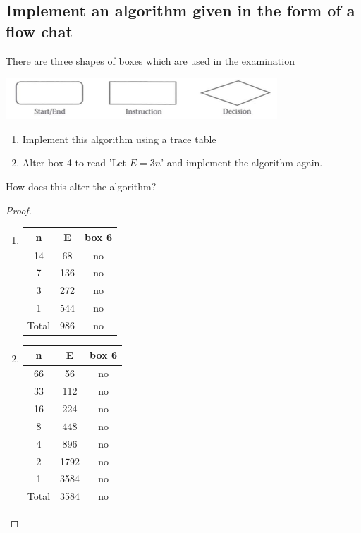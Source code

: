 \documentclass[a4paper]{article}
\begin{document}
\subsection{Implement an algorithm given in the form of a flow chat}
There are three shapes of boxes which are used in the examination\\
\begin{centering}
\includegraphics{img_D/2.png}
\end{centering}
\begin{eg}
\vspace{10pt}

\begin{enumerate}
\item Implement this algorithm using a trace table
\item Alter box 4 to read 'Let $E=3n$' and implement the algorithm again.
\end{enumerate}
How does this alter the algorithm?

\begin{proof}

\begin{enumerate}
\item \begin{tabular}{|c|c|c|}
          \hline
          n&E& box 6\\
          \hline
          14&68&no\\
          \hline
          7&136& no\\
          \hline
          3&272 &no\\
          \hline
          1&544 &no\\
          \hline
          Total & 986&no\\
          \hline          
          \end{tabular}
          
\item \begin{tabular}{|c|c|c|}
         \hline
          n&E&box 6\\
          \hline
          66&56&no\\
          \hline
          33&112& no\\
          \hline
          16&224&no \\
          \hline
          8&448&no \\
          \hline
          4&896&no \\
          \hline
          2&1792&no\\
          \hline
          1&3584&no\\
          \hline
          Total & 3584&no\\
          \hline          
          \end{tabular}


\end{enumerate}
\end{proof}
\end{eg}
\end{document}
